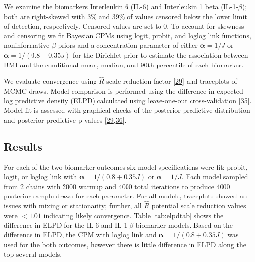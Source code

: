 \documentclass[
]{article}
\begin{document}
We examine the biomarkers Interleukin 6 (IL-6) and Interleukin 1 beta (IL-1-\(\beta\)); both are right-skewed with 3\% and 39\% of values censored below the lower limit of detection, respectively. Censored values are set to 0. To account for skewness and censoring we fit Bayesian CPMs using logit, probit, and loglog link functions, noninformative \(\beta\) priors and a concentration parameter of either \(\boldsymbol{\alpha}=1/J\) or \(\boldsymbol{\alpha}=1/(0.8+0.35J)\) for the Dirichlet prior to estimate the association between BMI and the conditional mean, median, and 90th percentile of each biomarker.

We evaluate convergence using \(\hat{R}\) scale reduction factor {[}\protect\hyperlink{ref-gelman_bayesian_2014}{29}{]} and traceplots of MCMC draws. Model comparison is performed using the difference in expected log predictive density (ELPD) calculated using leave-one-out cross-validation {[}\protect\hyperlink{ref-vehtari_practical_2017}{35}{]}. Model fit is assessed with graphical checks of the posterior predictive distribution and posterior predictive p-values {[}\protect\hyperlink{ref-gelman_bayesian_2014}{29},\protect\hyperlink{ref-stern_bayesian_2005}{36}{]}.

\hypertarget{results-1}{%
\subsection{Results}\label{results-1}}

For each of the two biomarker outcomes six model specifications were fit: probit, logit, or loglog link with \(\boldsymbol{\alpha}=1/(0.8+0.35J)\) or \(\boldsymbol{\alpha}=1/J\). Each model sampled from 2 chains with 2000 warmup and 4000 total iterations to produce 4000 posterior sample draws for each parameter. For all models, traceplots showed no issues with mixing or stationarity; further, all \(\hat{R}\) potential scale reduction values were \(<1.01\) indicating likely convergence. Table \ref{tab:elpdtab} shows the difference in ELPD for the IL-6 and IL-1-\(\beta\) biomarker models. Based on the difference in ELPD, the CPM with loglog link and \(\boldsymbol{\alpha}=1/(0.8+0.35J)\) was used for the both outcomes, however there is little difference in ELPD along the top several models.
\end{document}
